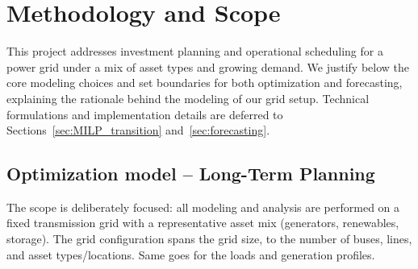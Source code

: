 










\newpage
\section{Methodology and Scope}
\label{sec:method_scope}

This project addresses investment planning and operational scheduling for a power grid under a mix of 
asset types and growing demand. We justify below the core modeling choices and set boundaries 
for both optimization and forecasting, explaining the rationale behind the modeling of our grid setup. 
Technical formulations and implementation details are deferred to Sections~\ref{sec:MILP_transition} 
and~\ref{sec:forecasting}.

\subsection{Optimization model -- Long-Term Planning}
The scope is deliberately focused: all modeling and analysis are performed on a fixed transmission 
grid with a representative asset mix (generators, renewables, storage). The grid configuration spans
the grid size, to the number of buses, lines, and asset types/locations. Same goes for the loads and 
generation profiles.

